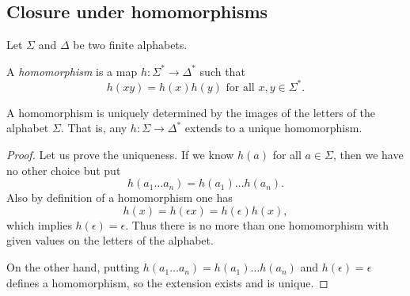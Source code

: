 \begin{page}
\setcounter{section}{3}
\setcounter{subsection}{3}
\setcounter{dfn}{7}
\label{portion:1009}

\subsection{Closure under homomorphisms}
Let $\Sigma$ and $\Delta$ be two finite alphabets.


\end{page}

\begin{page}
\setcounter{section}{3}
\setcounter{subsection}{3}
\setcounter{dfn}{8}
\label{portion:1011}

\begin{dfn}
A \emph{homomorphism} is a map $h \colon \Sigma^* \to \Delta^*$ such that
\[
h(xy) = h(x)h(y) \text{ for all }x, y \in \Sigma^*.
\]
\end{dfn}

\end{page}

\begin{page}
\setcounter{section}{3}
\setcounter{subsection}{3}
\setcounter{dfn}{9}
\label{portion:1014}

\begin{lem}
A homomorphism is uniquely determined by the images of the letters of the alphabet $\Sigma$.
That is, any $h \colon \Sigma \to \Delta^*$ extends to a unique homomorphism.
\end{lem}

\end{page}

\begin{page}
\setcounter{section}{3}
\setcounter{subsection}{3}
\setcounter{dfn}{9}
\label{portion:1015}

\begin{proof}
Let us prove the uniqueness.
If we know $h(a)$ for all $a \in \Sigma$, then we have no other choice but put
\[
h(a_1 \ldots a_n) = h(a_1) \ldots h(a_n).
\]
Also by definition of a homomorphism one has
\[
h(x) = h(\epsilon x) = h(\epsilon) h(x),
\]
which implies $h(\epsilon) = \epsilon$.
Thus there is no more than one homomorphism with given values on the letters of the alphabet.

On the other hand, putting $h(a_1 \ldots a_n) = h(a_1) \ldots h(a_n)$ and $h(\epsilon) = \epsilon$ defines a homomorphism,
so the extension exists and is unique.
\end{proof}


\end{page}

